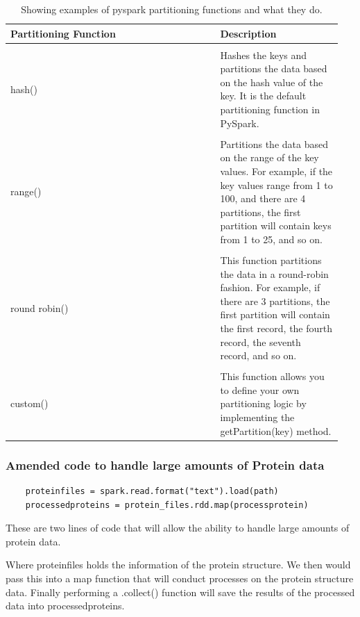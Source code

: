 \documentclass[]{final_report}
\begin{document}
\begin{table}[ht!]
    \begin{center}
        \label{tab:partitioning}
        \begin{tabular}{p{0.6\linewidth}|p{0.35\linewidth}}
            Partitioning Function & Description\\
            \hline
            \\
            hash() & Hashes the keys and partitions the data based on the hash value of the key. It is the default partitioning function in PySpark.
            \\
            \hline
            \\
            range() & Partitions the data based on the range of the key values. For example, if the key values range from 1 to 100, and there are 4 partitions, the first partition will contain keys from 1 to 25, and so on.
            \\
            \hline
            \\
            round robin() & This function partitions the data in a round-robin fashion. For example, if there are 3 partitions, the first partition will contain the first record, the fourth record, the seventh record, and so on.
            \\
            \hline
            \\
            custom() & This function allows you to define your own partitioning logic by implementing the getPartition(key) method.
        \end{tabular}
        \caption{\label{partitioning}Showing examples of pyspark partitioning functions and what they do.}
    \end{center}
\end{table}

\subsubsection{Amended code to handle large amounts of Protein data}

\begin{lstlisting}
    proteinfiles = spark.read.format("text").load(path)
    processedproteins = protein_files.rdd.map(processprotein)
\end{lstlisting}

These are two lines of code that will allow the ability to handle large amounts of protein data. 

Where proteinfiles holds the information of the protein structure. We then would pass this into a map function that will conduct processes on the protein structure data. Finally performing a .collect() function will save the results of the processed data into processedproteins.
\end{document}
